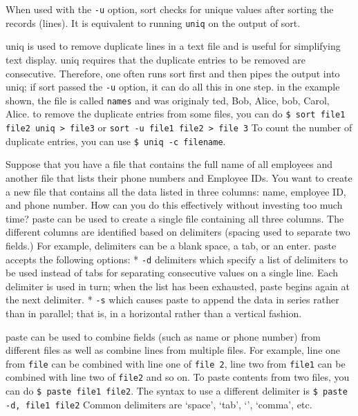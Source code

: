 When used with the \texttt{-u} option, sort checks for unique values
after sorting the records (lines). It is equivalent to running
\texttt{uniq} on the output of sort.

uniq is used to remove duplicate lines in a text file and is useful for
simplifying text display. uniq requires that the duplicate entries to be
removed are consecutive. Therefore, one often runs sort first and then
pipes the output into uniq; if sort passed the \texttt{-u} option, it
can do all this in one step. in the example shown, the file is called
\texttt{names} and was originaly ted, Bob, Alice, bob, Carol, Alice. to
remove the duplicate entries from some files, you can do
\texttt{\$ sort file1 file2 \textbar{} uniq \textgreater{} file3} or
\texttt{sort -u file1 file2 \textgreater{} file 3} To count the number
of duplicate entries, you can use \texttt{\$ uniq -c filename}.

Suppose that you have a file that contains the full name of all
employees and another file that lists their phone numbers and Employee
IDs. You want to create a new file that contains all the data listed in
three columns: name, employee ID, and phone number. How can you do this
effectively without investing too much time? paste can be used to create
a single file containing all three columns. The different columns are
identified based on delimiters (spacing used to separate two fields.)
For example, delimiters can be a blank space, a tab, or an enter. paste
accepts the following options: * \texttt{-d} delimiters which specify a
list of delimiters to be used instead of tabs for separating consecutive
values on a single line. Each delimiter is used in turn; when the list
has been exhausted, paste begins again at the next delimiter. *
\texttt{-s} which causes paste to append the data in series rather than
in parallel; that is, in a horizontal rather than a vertical fashion.

paste can be used to combine fields (such as name or phone number) from
different files as well as combine lines from multiple files. For
example, line one from \texttt{file} can be combined with line one of
\texttt{file 2}, line two from \texttt{file1} can be combined with line
two of \texttt{file2} and so on. To paste contents from two files, you
can do \texttt{\$ paste file1 file2}. The syntax to use a different
delimiter is \texttt{\$ paste -d, file1 file2} Common delimiters are
`space', `tab', `\textbar{}', `comma', etc.

